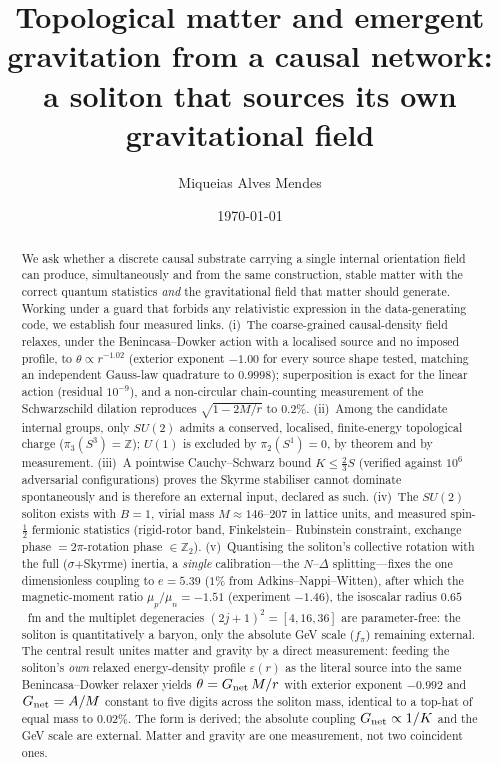 \documentclass[aps,prd,reprint,nofootinbib,superscriptaddress,floatfix]{revtex4-2}
\theoremstyle{plain}
\newcommand{\su}[1]{SU(#1)}
\begin{document}
\title{Topological matter and emergent gravitation from a causal network:\\
a soliton that sources its own gravitational field}

\author{Miqueias Alves Mendes}
\date{\today}

\begin{abstract}
We ask whether a discrete causal substrate carrying a single internal orientation
field can produce, simultaneously and from the same construction, stable matter with
the correct quantum statistics \emph{and} the gravitational field that matter should
generate. Working under a guard that forbids any relativistic expression in the
data-generating code, we establish four measured links. (i)~The coarse-grained
causal-density field relaxes, under the Benincasa--Dowker action with a localised
source and no imposed profile, to $\theta\propto r^{-1.02}$ (exterior exponent
$-1.00$ for every source shape tested, matching an independent Gauss-law quadrature
to $0.9998$); superposition is exact for the linear action (residual $10^{-9}$), and
a non-circular chain-counting measurement of the Schwarzschild dilation reproduces
$\sqrt{1-2M/r}$ to $0.2\%$. (ii)~Among the candidate internal groups, only $\su2$
admits a conserved, localised, finite-energy topological charge ($\pi_3(S^3)=
\mathbb{Z}$); $U(1)$ is excluded by $\pi_2(S^1)=0$, by theorem and by measurement.
(iii)~A pointwise Cauchy--Schwarz bound $K\le\tfrac23 S$ (verified against $10^6$
adversarial configurations) proves the Skyrme stabiliser cannot dominate
spontaneously and is therefore an external input, declared as such. (iv)~The $\su2$
soliton exists with $B=1$, virial mass $M\approx146$--$207$ in lattice units, and
measured spin-$\tfrac12$ fermionic statistics (rigid-rotor band, Finkelstein--
Rubinstein constraint, exchange phase $=2\pi$-rotation phase $\in\mathbb{Z}_2$).
(v)~Quantising the soliton's collective rotation with the full ($\sigma$+Skyrme)
inertia, a \emph{single} calibration---the $N$--$\Delta$ splitting---fixes the one
dimensionless coupling to $e=5.39$ ($1\%$ from Adkins--Nappi--Witten), after which
the magnetic-moment ratio $\mu_p/\mu_n=-1.51$ (experiment $-1.46$), the isoscalar
radius $0.65$~fm and the multiplet degeneracies $(2j+1)^2=[4,16,36]$ are
parameter-free: the soliton is quantitatively a baryon, only the absolute GeV scale
($f_\pi$) remaining external. The central result unites matter and gravity by a
direct measurement: feeding the soliton's \emph{own} relaxed energy-density profile
$\varepsilon(r)$ as the literal source into the same Benincasa--Dowker relaxer yields
$\theta=G_{\rm net}\,M/r$ with exterior exponent $-0.992$ and $G_{\rm net}=A/M$
constant to five digits across the soliton mass, identical to a top-hat of equal mass
to $0.02\%$. The form is derived; the absolute coupling $G_{\rm net}\propto1/K$ and the
GeV scale are external. Matter and gravity are one measurement, not two coincident ones.
\end{abstract}
\end{document}
